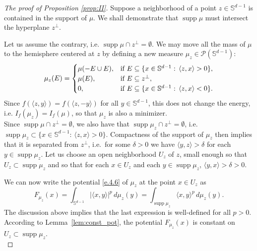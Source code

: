 \documentclass[11pt, leqno]{amsart}
\def\S{\mathbb S}
\theoremstyle{definition}
\numberwithin{equation}{section}
\begin{document}
\begin{proof}[The proof of Proposition \ref{prop:II}] 
Suppose a neighborhood of a point $z \in \mathbb{S}^{d-1}$ is contained in the support of $\mu$. We shall demonstrate that $\operatorname{supp}  \mu$ must intersect the hyperplane $z^\perp$. 

Let us assume the contrary, i.e. $\operatorname{supp} \mu \cap z^\perp = \emptyset$. We may move all the mass of $\mu$ to the hemisphere centered at $z$ by defining a new measure  $\mu_z \in \mathcal{P} (\S^{d-1})$:
$$ \mu_z( E) = \begin{cases} 
\mu( -E \cup E), & \textup{if } E \subseteq \{ x\in \mathbb S^{d-1} :\, \langle z, x\rangle >0 \},  \\
\mu(E), & \textup{if } E \subseteq z^\perp,  \\
0,  & \textup{if } E \subseteq  \{ x\in \mathbb S^{d-1} :\, \langle z, x\rangle < 0 \}.
\end{cases}$$
Since $f(\langle z, y \rangle) = f( \langle z, -y \rangle)$ for all $y \in \mathbb{S}^{d-1}$, this does not change the energy, i.e.  $ I_{f}( \mu_z) = I_{f}(\mu)$, so that $\mu_z$ is also  a minimizer.\\

Since  $\displaystyle{\operatorname{supp} \mu \cap z^\perp = \emptyset}$,   we also have that $\displaystyle{\operatorname{supp} \mu_z   \cap z^\perp = \emptyset}$, i.e.  $\operatorname{supp} \mu_z   \subset \{ x\in \mathbb S^{d-1} :\, \langle z, x\rangle >0 \}$. Compactness of   the support of $\mu_{z}$ then implies that it is separated from $z^\perp$, i.e.\ for some $\delta >0$  we have  $\langle y , z \rangle > \delta$ for each $y \in \operatorname{supp} \mu_z  $. Let us choose an open neighborhood $U_z$ of $z$, small enough so that $U_z \subset \operatorname{supp} \mu_z  $ and so that for each $x\in U_z $ and each $y \in \operatorname{supp} \mu_z$, $\langle y , x \rangle > \delta >0$.

We can now write the potential \eqref{e.4.6} of $\mu_z$ at the point $x \in U_z$ as 
\begin{equation}
 F_{\mu_z}(x) = \int_{ \mathbb{S}^{d-1} } | \langle x, y \rangle |^p \,  d \mu_z(y) = \int_{ \operatorname{supp}  \mu_z  }  \langle x, y \rangle^p  \, d \mu_z(y).
 \end{equation}
The discussion above implies that the last expression is well-defined for all $p>0$.  According to Lemma~\ref{lem:const_pot}, the potential   $F_{\mu_z} (x) $ is constant on $U_z \subset  \operatorname{supp} \mu_z $.\\


\end{proof}
\end{document}
